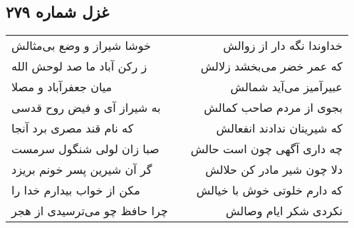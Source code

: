 \begin{center}
\section*{غزل شماره ۲۷۹}
\label{sec:sh279}
\begin{longtable}{l p{0.5cm} r}
خوشا شیراز و وضع بی‌مثالش
&&
خداوندا نگه دار از زوالش
\\
ز رکن آباد ما صد لوحش الله
&&
که عمر خضر می‌بخشد زلالش
\\
میان جعفرآباد و مصلا
&&
عبیرآمیز می‌آید شمالش
\\
به شیراز آی و فیض روح قدسی
&&
بجوی از مردم صاحب کمالش
\\
که نام قند مصری برد آنجا
&&
که شیرینان ندادند انفعالش
\\
صبا زان لولی شنگول سرمست
&&
چه داری آگهی چون است حالش
\\
گر آن شیرین پسر خونم بریزد
&&
دلا چون شیر مادر کن حلالش
\\
مکن از خواب بیدارم خدا را
&&
که دارم خلوتی خوش با خیالش
\\
چرا حافظ چو می‌ترسیدی از هجر
&&
نکردی شکر ایام وصالش
\\
\end{longtable}
\end{center}
